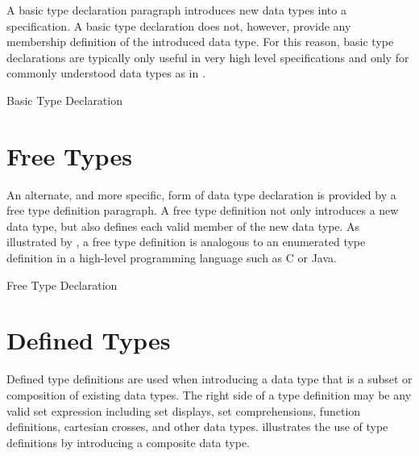 \documentclass[letterpaper,10pt,draft]{book}
\begin{document}
A basic type declaration paragraph introduces new data types into a specification.
A basic type declaration does not, however, provide any membership definition of
the introduced data type.  For this reason, basic type declarations are typically
only useful in very high level specifications and only for commonly understood data
types as in .

\begin{example}
\begin{minipage}[t]{0.49\linewidth}
   
\end{minipage}
\begin{minipage}[t]{0.49\linewidth}
   \azed
   
\end{minipage}

   \caption{Basic Type Declaration}
   \label{ex:BasicDecl}
\end{example}

\section{Free Types}
   \label{sect:Free}

An alternate, and more specific, form of data type declaration is provided by a
free type definition paragraph.  A free type definition not only introduces a new
data type, but also defines each valid member of the new data type.  As illustrated
by , a free type definition is analogous to an enumerated type
definition in a high-level programming language such as C or Java.

\begin{example}
\begin{minipage}[t]{0.49\linewidth}
   
\end{minipage}
\begin{minipage}[t]{0.49\linewidth}
   \azed
   
\end{minipage}

   \caption{Free Type Declaration}
   \label{ex:FreeDecl}
\end{example}

\section{Defined Types}
   \label{sect:TypeDef}

Defined type definitions are used when introducing a data type that is a subset
or composition of existing data types.  The right side of a type definition may
be any valid set expression including set displays, set comprehensions, function
definitions, cartesian crosses, and other data types.   illustrates
the use of type definitions by introducing a composite data type.
\end{document}
